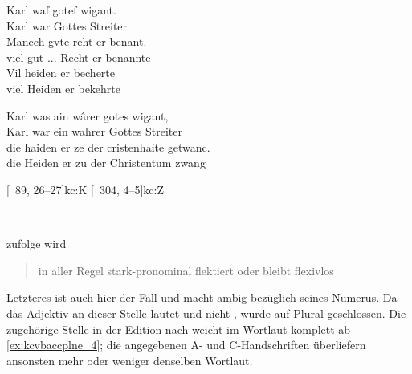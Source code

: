 \begin{exe}
\ex \label{ex:kcvbaccplne}
	\begin{xlist}
	\ex \gll Karl waſ goteſ wigant. \\
			Karl war Gottes Streiter \\
	\sn \gll Manech gvte reht er benant. \\
			viel gut-\Acc.\Pl.\NeutI.\St{} Recht er benannte \\
	\sn \gll Vil heiden er becherte \\
			viel Heiden er bekehrte \\
		\begin{taggedline}{\parencites[\pno~100\vb, 13--15]{kc:VB}[vgl.][40\va,
		10--12]{kc:B1}}
		\trans {}
		\end{taggedline}
		\label{ex:kcvbaccplne_2}

	\ex \gll Karl was ain wârer gotes wigant, \\
			Karl war ein wahrer Gottes Streiter \\
	\sn \gll die haiden er ze der cristenhaite getwanc. \\
			die Heiden er zu der Christentum zwang \\
		\begin{taggedline}{%
			\parencites[15073--15074]{schroeder1895}[vgl.]%
			[\pno~64\va, 37--38]{kc:A1}%
			[\pno~115\va, 13--14]{kc:M}%
			[\pno~92\ra, 1--2]{kc:H}%
			[\pno~78\rb, 34]{kc:C1}%
			[\pno~89\rb, 26--27]{kc:K}%
			[\pno~304\va, 4--5]{kc:Z}%
		}
		\trans {}
		\end{taggedline}
		\label{ex:kcvbaccplne_4}
		\\
	\end{xlist}
\end{exe}

\citeauthor{ksw2} zufolge wird  \blockcquote[585]{ksw2}{in
aller Regel stark-pronominal flektiert oder bleibt flexivlos}. Letzteres ist
auch hier der Fall und macht   ambig bezüglich seines
Numerus. Da das Adjektiv an dieser Stelle   lautet und
nicht  , wurde auf Plural geschlossen. Die zugehörige
Stelle in der Edition nach \citet{kc:A1} weicht im Wortlaut komplett ab
\cref{ex:kcvbaccplne_4}; die angegebenen A- und C-Handschriften überliefern
ansonsten mehr oder weniger denselben Wortlaut.

